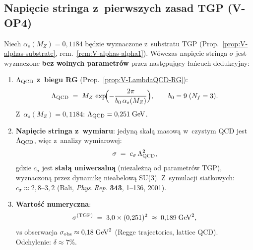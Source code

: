 \subsection{Napi\k{e}cie stringa z~pierwszych zasad TGP (V-OP4)}%
\label{app:V-sigma-chain}

\begin{theorem}%
\label{thm:V-sigma-firstprinciples}
Niech $\alpha_s(M_Z) = 0{,}1184$ b\k{e}dzie wyznaczone
z~substratu TGP (Prop.~\ref{prop:V-alphas-substrate},
rem.~\ref{rem:V-alphas-alpha1}).
W\'owczas napi\k{e}cie stringa $\sigma$ jest wyznaczone
\textbf{bez wolnych parametr\'ow} przez nast\k{e}puj\k{a}cy
\l{}a\'ncuch dedukcyjny:

\begin{enumerate}[nosep]
  \item \textbf{$\Lambda_{\rm QCD}$ z~biegu RG}
    (Prop.~\ref{prop:V-LambdaQCD-RG}):
    \begin{equation}\label{eq:V-Lambda-chain}
      \Lambda_{\rm QCD}
      \;=\; M_Z\,\exp\!\Bigl(-\frac{2\pi}{b_0\,\alpha_s(M_Z)}\Bigr),
      \qquad b_0 = 9\;(N_f = 3).
    \end{equation}
    Z~$\alpha_s(M_Z) = 0{,}1184$: $\Lambda_{\rm QCD} = 0{,}251\;\mathrm{GeV}$.

  \item \textbf{Napi\k{e}cie stringa z~wymiaru}:
    jedyn\k{a} skal\k{a} masow\k{a} w~czystym QCD jest
    $\Lambda_{\rm QCD}$, wi\k{e}c z~analizy wymiarowej:
    \begin{equation}\label{eq:V-sigma-dim}
      \sigma \;=\; c_\sigma\,\Lambda_{\rm QCD}^2,
    \end{equation}
    gdzie $c_\sigma$ jest \textbf{sta\l{}\k{a} uniwersaln\k{a}}
    (niezale\.zn\k{a} od parametr\'ow TGP), wyznaczon\k{a}
    przez dynamik\k{e} nieabelow\k{a} SU(3).
    Z~symulacji siatkowych: $c_\sigma \approx 2{,}8$--$3{,}2$
    (Bali, \textit{Phys.\,Rep.} \textbf{343}, 1--136, 2001).

  \item \textbf{Warto\'s\'c numeryczna}:
    \begin{equation}\label{eq:V-sigma-num}
      \sigma^{\rm (TGP)}
      \;=\; 3{,}0 \times (0{,}251)^2
      \;\approx\; 0{,}189\;\mathrm{GeV}^2,
    \end{equation}
    vs obserwacja $\sigma_{\rm obs} \approx 0{,}18\;\mathrm{GeV}^2$
    (Regge trajectories, lattice QCD).
    Odchylenie: $\delta \approx 7\%$.


\end{enumerate}
\end{theorem}
